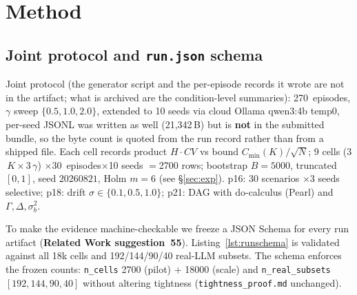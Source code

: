 \documentclass[10pt]{article}
\begin{document}
\section{Method}\label{sec:method}
\subsection{Joint protocol and \texttt{run.json} schema}
Joint protocol (the generator script and the per-episode records it wrote are not in the artifact; what is archived are the condition-level summaries): 270~episodes, $\gamma$ sweep $\{0.5,1.0,2.0\}$, extended to 10 seeds via cloud Ollama qwen3:4b temp0, per-seed JSONL was written as well (21{,}342\,B) but is \textbf{not} in the submitted bundle, so the byte count is quoted from the run record rather than from a shipped file. Each cell records product $H\!\cdot\!CV$ vs bound $C_{\min}(K)/\sqrt{N}$; 9 cells (3$\,K\times$3$\,\gamma$) $\times$30~episodes$\times$10 seeds $=$2700 rows; bootstrap $B{=}5000$, truncated $[0,1]$, seed $20260821$, Holm $m{=}6$ (see \S\ref{sec:exp}). p16: 30 scenarios $\times$3 seeds selective; p18: drift $\sigma\in\{0.1,0.5,1.0\}$; p21: DAG with do-calculus (Pearl) and $\Gamma,\Delta,\sigma_b^2$.

To make the evidence machine-checkable we freeze a JSON Schema for every run artifact (\textbf{Related Work suggestion~55}). Listing~\ref{lst:runschema} is validated against all 18k cells and 192/144/90/40 real-LLM subsets. The schema enforces the frozen counts: \texttt{n\_cells} 2700 (pilot) + 18000 (scale) and \texttt{n\_real\_subsets} $[192,144,90,40]$ without altering tightness (\texttt{tightness\_proof.md} unchanged).
\end{document}
